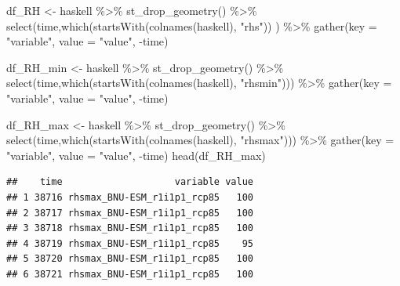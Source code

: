 \documentclass[
  paper=a4,
  ,captions=tableheading
]{scrartcl}
\newenvironment{Shaded}{\begin{snugshade}}{\end{snugshade}}
\newcommand{\AttributeTok}[1]{\textcolor[rgb]{0.77,0.63,0.00}{#1}}
\newcommand{\FunctionTok}[1]{\textcolor[rgb]{0.00,0.00,0.00}{#1}}
\newcommand{\NormalTok}[1]{#1}
\newcommand{\OtherTok}[1]{\textcolor[rgb]{0.56,0.35,0.01}{#1}}
\newcommand{\SpecialCharTok}[1]{\textcolor[rgb]{0.00,0.00,0.00}{#1}}
\newcommand{\StringTok}[1]{\textcolor[rgb]{0.31,0.60,0.02}{#1}}
\begin{document}
\begin{Shaded}
\begin{Highlighting}[]
\NormalTok{df\_RH }\OtherTok{\textless{}{-}}\NormalTok{ haskell }\SpecialCharTok{\%\textgreater{}\%}
  \FunctionTok{st\_drop\_geometry}\NormalTok{() }\SpecialCharTok{\%\textgreater{}\%}
  \FunctionTok{select}\NormalTok{(time,}\FunctionTok{which}\NormalTok{(}\FunctionTok{startsWith}\NormalTok{(}\FunctionTok{colnames}\NormalTok{(haskell), }\StringTok{"rhs"}\NormalTok{)) ) }\SpecialCharTok{\%\textgreater{}\%}
  \FunctionTok{gather}\NormalTok{(}\AttributeTok{key =} \StringTok{"variable"}\NormalTok{, }\AttributeTok{value =} \StringTok{"value"}\NormalTok{, }\SpecialCharTok{{-}}\NormalTok{time)}

\NormalTok{df\_RH\_min }\OtherTok{\textless{}{-}}\NormalTok{ haskell }\SpecialCharTok{\%\textgreater{}\%}
  \FunctionTok{st\_drop\_geometry}\NormalTok{() }\SpecialCharTok{\%\textgreater{}\%}
  \FunctionTok{select}\NormalTok{(time,}\FunctionTok{which}\NormalTok{(}\FunctionTok{startsWith}\NormalTok{(}\FunctionTok{colnames}\NormalTok{(haskell), }\StringTok{"rhsmin"}\NormalTok{))) }\SpecialCharTok{\%\textgreater{}\%}
  \FunctionTok{gather}\NormalTok{(}\AttributeTok{key =} \StringTok{"variable"}\NormalTok{, }\AttributeTok{value =} \StringTok{"value"}\NormalTok{, }\SpecialCharTok{{-}}\NormalTok{time)}

\NormalTok{df\_RH\_max }\OtherTok{\textless{}{-}}\NormalTok{ haskell }\SpecialCharTok{\%\textgreater{}\%}
  \FunctionTok{st\_drop\_geometry}\NormalTok{() }\SpecialCharTok{\%\textgreater{}\%}
  \FunctionTok{select}\NormalTok{(time,}\FunctionTok{which}\NormalTok{(}\FunctionTok{startsWith}\NormalTok{(}\FunctionTok{colnames}\NormalTok{(haskell), }\StringTok{"rhsmax"}\NormalTok{))) }\SpecialCharTok{\%\textgreater{}\%}
  \FunctionTok{gather}\NormalTok{(}\AttributeTok{key =} \StringTok{"variable"}\NormalTok{, }\AttributeTok{value =} \StringTok{"value"}\NormalTok{, }\SpecialCharTok{{-}}\NormalTok{time)}
\FunctionTok{head}\NormalTok{(df\_RH\_max)}
\end{Highlighting}
\end{Shaded}

\begin{verbatim}
##    time                    variable value
## 1 38716 rhsmax_BNU-ESM_r1i1p1_rcp85   100
## 2 38717 rhsmax_BNU-ESM_r1i1p1_rcp85   100
## 3 38718 rhsmax_BNU-ESM_r1i1p1_rcp85   100
## 4 38719 rhsmax_BNU-ESM_r1i1p1_rcp85    95
## 5 38720 rhsmax_BNU-ESM_r1i1p1_rcp85   100
## 6 38721 rhsmax_BNU-ESM_r1i1p1_rcp85   100
\end{verbatim}
\end{document}
